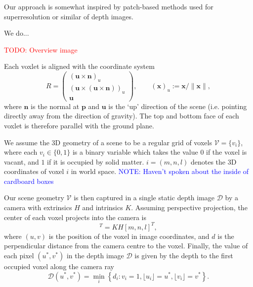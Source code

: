 \documentclass[10pt,twocolumn,letterpaper]{article}
\makeatletter
\renewcommand*{\ie}{i.e.\@\xspace}
\newcommand{\rgbdimage}{\mathcal{D}}
\newcommand{\intrinsics}{K}
\newcommand{\voxelgrid}{\mathcal{V}}
\newcommand{\voxel}{v}
\newcommand{\voxidx}{i}
\newcommand{\voxelidxs}{m, n, l}
\newcommand{\point}{\mathbf{p}}
\newcommand{\normal}{\mathbf{n}}
\newcommand{\updir}{\mathbf{u}}
\newcommand{\trans}{T}
\newcommand{\extrinsics}{H}
\newcommand{\voxelgridtoworld}{\trans_{\voxelgrid \rightarrow w}}
\newcommand{\todo}[1]{\textcolor{red}{TODO: #1}}
\newcommand{\note}[1]{\textcolor{blue}{NOTE: #1}}
\makeatother
\begin{document}
Our approach is somewhat inspired by patch-based methods used for superresolution or similar of depth images. 

We do...

\todo{Overview image}

Each voxlet is aligned with the coordinate system
\begin{equation}
  R = 
  \left( \begin{array}{ccc}
  (\updir \times \normal)_{u} \\
  (\updir \times (\updir \times \normal)  )_{u} \\
  \updir 
  \end{array}\right), \qquad
  (\mathbf{x})_{u} := \mathbf{x} / \| \mathbf{x} \|,
\end{equation}
where $\normal$ is the normal at $\point$ and $\updir$ is the `up' direction of the scene (\ie pointing directly away from the direction of gravity).
The top and bottom face of each voxlet is therefore parallel with the ground plane.


We assume the 3D geometry of a scene to be a regular grid of voxels $\voxelgrid = \{\voxel_\voxidx\}$, where each $\voxel_\voxidx \in \{0, 1\}$ is a binary variable which takes the value $0$ if the voxel is vacant, and $1$ if it is occupied by solid matter.
$\voxidx = (\voxelidxs)$ denotes the 3D coordinates of voxel $\voxidx$ in world space.
\note{Haven't spoken about the inside of cardboard boxes}

Our scene geometry $\voxelgrid$ is then captured in a single static depth image $\rgbdimage$ by a camera with extrinsics $\extrinsics$ and intrinsics $\intrinsics$. 
Assuming perspective projection, the center of each voxel projects into the camera is
\begin{equation}
[u, v, d]^T = \intrinsics \extrinsics [\voxelidxs]^T,
\end{equation}
where $(u,v)$ is the position of the voxel in image coordinates, and $d$ is the  perpendicular distance from the camera centre to the voxel.
Finally, the value of each pixel $(u^*, v^*)$ in the depth image $\rgbdimage$ is given by the depth to the first occupied voxel along the camera ray
\begin{equation}
\rgbdimage(u^*,v^*) = \min_\voxidx \left\{ d_{\voxidx} : v_{\voxidx} = 1, \lfloor u_{\voxidx} \rfloor = u^*, \lfloor v_{\voxidx} \rfloor = v^* \right\}.
\label{eqn:minimisation}
\end{equation}
\end{document}
